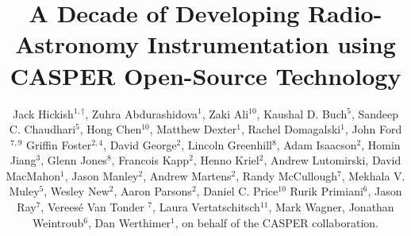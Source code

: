 \documentclass{ws-jai}
\begin{document}
\catchline{}{}{}{}{} %


\title{A Decade of Developing Radio-Astronomy Instrumentation using CASPER Open-Source Technology}

\author{Jack Hickish$^{1,\dagger}$,
 Zuhra Abdurashidova$^1$,
 Zaki Ali$^{10}$,
 Kaushal D. Buch$^5$,
 Sandeep C. Chaudhari$^5$,
 Hong Chen$^{10}$,
 Matthew Dexter$^1$,
 Rachel Domagalski$^1$,
 John Ford $^{7,9}$
 Griffin Foster$^{2,4}$,
 David George$^2$,
 Lincoln Greenhill$^8$,
 Adam Isaacson$^2$,
 Homin Jiang$^3$,
 Glenn Jones$^8$,
 Francois Kapp$^2$,
 Henno Kriel$^2$,
 Andrew Lutomirski,
 David MacMahon$^1$,
 Jason Manley$^2$,
 Andrew Martens$^2$,
 Randy McCullough$^7$,
 Mekhala V. Muley$^5$,
 Wesley New$^2$,
 Aaron Parsons$^2$,
 Daniel C. Price$^{10}$
 Rurik Primiani$^6$,
 Jason Ray$^7$,
 Verees\'e Van Tonder $^7$,
 Laura Vertatschitsch$^{11}$,
 Mark Wagner,
 Jonathan Weintroub$^6$,
 Dan Werthimer$^1$,
 on behalf of the CASPER collaboration.
}


\address{
$^1$Radio Astronomy Laboratory, UC Berkeley, Berkeley, CA 94720, USA \\
$^2$SKA Africa, 3rd Floor, The Park, Park Road, Pinelands, Cape Town, 7405, South Africa \\
$^3$Academia Sinica, Institute of Astronomy and Astrophysics, Taiwan \\
$^4$Department of Physics and Electronics, Rhodes University, P.O. Box 94, Grahamstown 6140, South Africa\\
$^5$Digital Backend Group, Giant Metrewave Radio Telescope, NCRA-TIFR, Pune, 410504, India \\
$^6$Harvard-Smithsonian Center for Astrophysics, 60 Garden Street, Cambridge, MA 02138, USA \\
$^7$National Radio Astronomy Observatory, 166 Observatory Rd, Green Bank, WV 24944, USA \\
$^8$Department of Physics, Columbia University, 550 W. 120th St. New York, NY 10027, USA \\
$^9$Steward Observatory, University of Arizona, Tucson, AZ 85721, USA \\
$^{10}$Department of Astronomy, UC Berkeley, Berkeley, CA 94720, USA \\
$^{11}$Systems \& Technology Research, 600 West Cummings Park, Suite 6500, Woburn, MA 01801, USA \\
}
\end{document}
